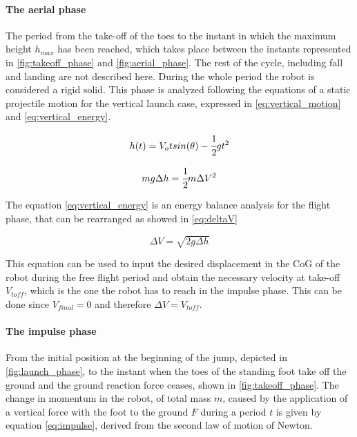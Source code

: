 \paragraph{The aerial phase}
The period from the take-off of the toes to the instant in which the maximum height $h_{max}$ has been reached, which takes place between the instants represented in \ref{fig:takeoff_phase} and \ref{fig:aerial_phase}. 
The rest of the cycle, including fall and landing are not described here.
During the whole period the robot is considered a rigid solid.
This phase is analyzed following the equations of a static projectile motion for the vertical launch case, expressed in \ref{eq:vertical_motion} and \ref{eq:vertical_energy}.

\begin{equation}
\label{eq:vertical_motion}	
	h(t) = V_o t sin(\theta) - \cfrac{1}{2} g t^2 
\end{equation}

\begin{equation}
\label{eq:vertical_energy}
	m g \Delta h = \cfrac{1}{2} m \Delta V^2
\end{equation}

The equation \ref{eq:vertical_energy} is an energy balance analysis for the flight phase, that can be rearranged as showed in \ref{eq:deltaV}

\begin{equation}
\label{eq:deltaV}
	\Delta V = \sqrt{2 g \Delta h}
\end{equation}

This equation can be used to input the desired displacement in the CoG of the robot during the free flight period and obtain the necessary velocity at take-off $V_{toff}$, which is the one the robot has to reach in the impulse phase.
This can be done since $V_{final} = 0$ and therefore $\Delta V = V_{toff}$.

\paragraph{The impulse phase}
From the initial position at the beginning of the jump, depicted in \ref{fig:launch_phase}, to the instant when the toes of the standing foot take off the ground and the ground reaction force ceases, shown in \ref{fig:takeoff_phase}.
The change in momentum in the robot, of total mass $m$, caused by the application of a vertical force with the foot to the ground $F$ during a period $t$ is given by equation \ref{eq:impulse}, derived from the second law of motion of Newton.

